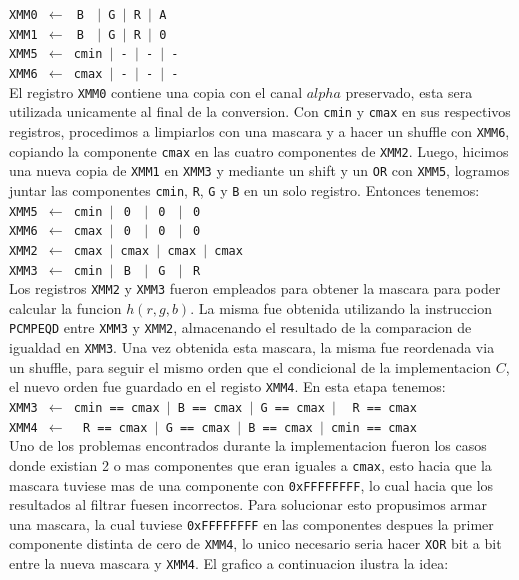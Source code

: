 \noindent
\texttt{XMM0 $\gets\ $ B $\ \ \vert$ G $\vert$ R $\vert$ A}\\
\texttt{XMM1 $\gets\ $ B $\ \ \vert$ G $\vert$ R $\vert$ 0}\\
\texttt{XMM5 $\gets$ cmin    $\vert$ - $\vert$ - $\vert$ -}\\
\texttt{XMM6 $\gets$ cmax    $\vert$ - $\vert$ - $\vert$ -}\\

El registro \texttt{XMM0} contiene una copia con el canal $alpha$ preservado, esta sera utilizada unicamente al final de la conversion.
Con \texttt{cmin} y \texttt{cmax} en sus respectivos registros, procedimos a limpiarlos con una mascara y a hacer un shuffle con \texttt{XMM6}, copiando la componente \texttt{cmax} en las cuatro componentes de \texttt{XMM2}. Luego, hicimos una nueva copia de \texttt{XMM1} en \texttt{XMM3} y mediante un shift y un \texttt{OR} con \texttt{XMM5}, logramos juntar las componentes \texttt{cmin}, \texttt{R}, \texttt{G} y \texttt{B} en un solo registro. Entonces tenemos:\\

\noindent
\texttt{XMM5 $\gets$ cmin $\vert\ $ 0 $\ \ \vert\ $ 0  $\ \ \vert\ $ 0}\\
\texttt{XMM6 $\gets$ cmax $\vert\ $ 0 $\ \ \vert\ $ 0  $\ \ \vert\ $ 0}\\
\texttt{XMM2 $\gets$ cmax $\vert$ cmax    $\vert$ cmax $\vert$ cmax}\\
\texttt{XMM3 $\gets$ cmin $\vert\ $ B $\ \ \vert\ $ G  $\ \ \vert\ $ R}\\

Los registros \texttt{XMM2} y \texttt{XMM3} fueron empleados para obtener la mascara para poder calcular la funcion $h(r,g,b)$. La misma fue obtenida utilizando la instruccion \texttt{PCMPEQD} entre \texttt{XMM3} y \texttt{XMM2}, almacenando el resultado de la comparacion de igualdad en \texttt{XMM3}. Una vez obtenida esta mascara, la misma fue reordenada via un shuffle, para seguir el mismo orden que el condicional de la implementacion $C$, el nuevo orden fue guardado en el registo \texttt{XMM4}. En esta etapa tenemos:\\

\noindent
\texttt{XMM3 $\gets$ cmin == cmax $\vert$ B == cmax $\vert$ G == cmax  $\vert\ \ \ $ R == cmax}\\
\texttt{XMM4 $\gets\ \ \ $ R == cmax $\vert$ G == cmax $\vert$ B == cmax  $\vert$ cmin == cmax}\\

Uno de los problemas encontrados durante la implementacion fueron los casos donde existian 2 o mas componentes que eran iguales a \texttt{cmax}, esto hacia que la mascara tuviese mas de una componente con \texttt{0xFFFFFFFF}, lo cual hacia que los resultados al filtrar fuesen incorrectos. Para solucionar esto propusimos armar una mascara, la cual tuviese \texttt{0xFFFFFFFF} en las componentes despues la primer componente distinta de cero de \texttt{XMM4}, lo unico necesario seria hacer \texttt{XOR} bit a bit entre la nueva mascara y \texttt{XMM4}. El grafico a continuacion ilustra la idea:

